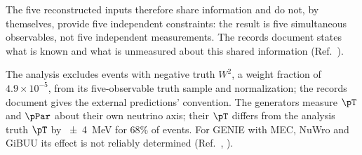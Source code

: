 The five reconstructed inputs therefore share information and do not, by themselves, provide five independent constraints: the result is five simultaneous observables, not five independent measurements. The records document states what is known and what is unmeasured about this shared information (Ref.~\cite{NoteRecords2026}).

The analysis excludes events with negative truth $W^{2}$, a weight fraction of $4.9\times10^{-5}$, from its five-observable truth sample and normalization; the records document gives the external predictions' convention. The generators measure $\pT$ and $\pPar$ about their own neutrino axis; their $\pT$ differs from the analysis truth $\pT$ by \SI{\pm4}{MeV} for 68\% of events. For GENIE with MEC, NuWro and GiBUU its effect is not reliably determined (Ref.~\cite{NoteRecords2026}, ).

